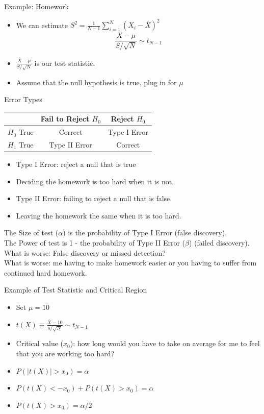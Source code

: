 \documentclass{beamer}
\numberwithin{equation}{section}
\begin{document}
\begin{frame}{Example: Homework}
\begin{itemize}
\item We can estimate $S^2=\frac{1}{N-1}\sum_{i=1}^N(X_i-\bar{X})^2$\pause
$$\frac{\bar{X}-\mu}{S/\sqrt{N}}\sim t_{N-1}$$\pause
\item $\frac{\bar{X}-\mu}{S/\sqrt{N}}$ is our test statistic. \pause
\item Assume that the null hypothesis is true, plug in for $\mu$
\end{itemize}
\end{frame}


\begin{frame}{Error Types}
\begin{table}[htdp]
\begin{center}
\begin{tabular}{l|c|c|}
& Fail to Reject $H_0$& Reject $H_0$\\
\hline
$H_0$ True& Correct & Type I Error\\
$H_1$ True& Type II Error & Correct\\
\end{tabular}
\end{center}
\end{table}
\begin{itemize}
\item Type I Error: reject a null that is true\pause
\item[] Deciding the homework is too hard when it is not.\pause
\item Type II Error: failing to reject a null that is false.\pause
\item[] Leaving the homework the same when it is too hard.\pause
\end{itemize}
The \alert{Size} of test ($\alpha$) is the probability of Type I Error (false discovery).\\ \pause
The \alert{Power} of test is 1 - the probability of Type II Error ($\beta$) (failed discovery).\\
What is worse: False discovery or missed detection?\\\pause
What is worse: me having to make homework easier or you having to suffer from continued hard homework.
\end{frame}


\begin{frame}{Example of Test Statistic and Critical Region}
\begin{itemize}
\item Set $\mu=10$\pause
\item $t(X)\equiv \frac{\bar{X}-10}{s/\sqrt{N}}\sim t_{N-1}$\pause
\item Critical value ($x_0$): how long would you have to take on average for me to feel that you are working too hard?\pause
\item $P(|t(X)|>x_0)=\alpha$\pause
\item $P(t(X)< -x_0)+P(t(X)> x_0)=\alpha$
\item $P(t(X)>x_0)=\alpha/2$
\end{itemize}
\end{frame}
\end{document}
